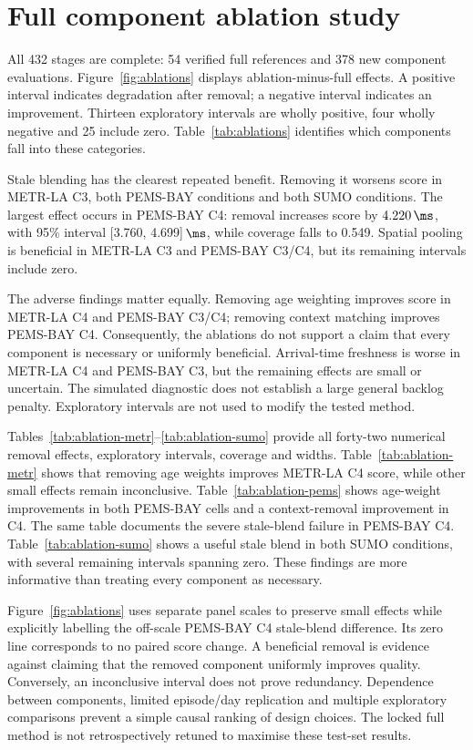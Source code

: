 \section{Full component ablation study}\label{sec:ablation}

All 432 stages are complete: 54 verified full references and 378 new component evaluations. Figure~\ref{fig:ablations} displays ablation-minus-full effects. A positive interval indicates degradation after removal; a negative interval indicates an improvement. Thirteen exploratory intervals are wholly positive, four wholly negative and 25 include zero. Table~\ref{tab:ablations} identifies which components fall into these categories.

Stale blending has the clearest repeated benefit. Removing it worsens score in METR-LA C3, both PEMS-BAY conditions and both SUMO conditions. The largest effect occurs in PEMS-BAY C4: removal increases score by $4.220\,\ms$, with 95\% interval [3.760, 4.699]\,$\ms$, while coverage falls to 0.549. Spatial pooling is beneficial in METR-LA C3 and PEMS-BAY C3/C4, but its remaining intervals include zero.

The adverse findings matter equally. Removing age weighting improves score in METR-LA C4 and PEMS-BAY C3/C4; removing context matching improves PEMS-BAY C4. Consequently, the ablations do not support a claim that every component is necessary or uniformly beneficial. Arrival-time freshness is worse in METR-LA C4 and PEMS-BAY C3, but the remaining effects are small or uncertain. The simulated diagnostic does not establish a large general backlog penalty. Exploratory intervals are not used to modify the tested method.


Tables~\ref{tab:ablation-metr}--\ref{tab:ablation-sumo} provide all forty-two numerical removal effects, exploratory intervals, coverage and widths. Table~\ref{tab:ablation-metr} shows that removing age weights improves METR-LA C4 score, while other small effects remain inconclusive. Table~\ref{tab:ablation-pems} shows age-weight improvements in both PEMS-BAY cells and a context-removal improvement in C4. The same table documents the severe stale-blend failure in PEMS-BAY C4. Table~\ref{tab:ablation-sumo} shows a useful stale blend in both SUMO conditions, with several remaining intervals spanning zero. These findings are more informative than treating every component as necessary.

Figure~\ref{fig:ablations} uses separate panel scales to preserve small effects while explicitly labelling the off-scale PEMS-BAY C4 stale-blend difference. Its zero line corresponds to no paired score change. A beneficial removal is evidence against claiming that the removed component uniformly improves quality. Conversely, an inconclusive interval does not prove redundancy. Dependence between components, limited episode/day replication and multiple exploratory comparisons prevent a simple causal ranking of design choices. The locked full method is not retrospectively retuned to maximise these test-set results.


